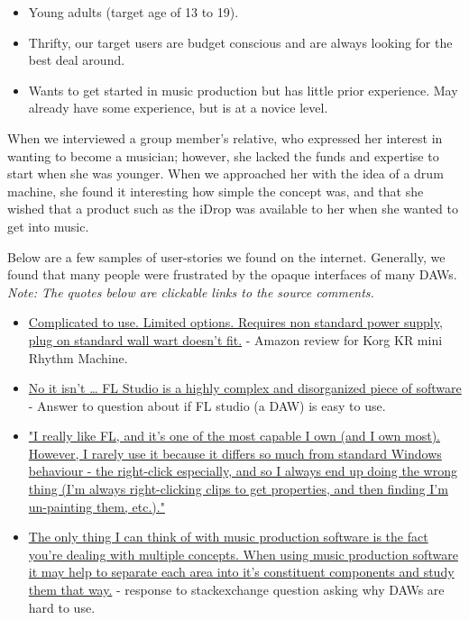 \documentclass[11pt]{article}
\begin{document}
\begin{itemize}
\item Young adults (target age of 13 to 19).
\item Thrifty, our target users are budget conscious and are always looking for the best deal around.
\item Wants to get started in music production but has little prior experience. May already have some experience, but is at a novice level.
\end{itemize}


When we interviewed a group member’s relative, who expressed her
interest in wanting to become a musician; however, she lacked the
funds and expertise to start when she was younger. When we approached
her with the idea of a drum machine, she found it interesting how
simple the concept was, and that she wished that a product such as the
iDrop was available to her when she wanted to get into music.

Below are a few samples of user-stories we found on the internet. Generally,
we found that many people were frustrated by the opaque interfaces of many
DAWs. \emph{Note: The quotes below are clickable links to the source comments.}

\begin{itemize}
\item \href{https://www.amazon.ca/gp/customer-reviews/R1OFNI0GNZ2VC?ref=pf\_vv\_at\_pdctrvw\_srp}{ Complicated to use. Limited options. Requires non standard power supply, plug on standard wall wart doesn't fit.} - Amazon review for Korg KR mini Rhythm Machine.
\item \href{https://www.quora.com/Is-FL-Studio-easy-to-learn}{No it isn't \ldots{} FL Studio is a highly complex and disorganized piece of software} - Answer to question about if FL studio (a DAW) is easy to use.
\item \href{https://www.kvraudio.com/forum/viewtopic.php?f=7\&t=360703\&sid=2d239239fdd437172d4208545e3d608b}{"I really like FL, and it's one of the most capable I own (and I own most). However, I rarely use it because it differs so much from standard Windows behaviour - the right-click especially, and so I always end up doing the wrong thing (I'm always right-clicking clips to get properties, and then finding I'm un-painting them, etc.)." }
\item \href{https://sound.stackexchange.com/questions/25161/why-is-learning-how-to-use-daws-appear-more-difficult-than-video-editing-program}{ The only thing I can think of with music production software is the fact you're dealing with multiple concepts. When using music production software it may help to separate each area into it's constituent components and study them that way.} - response to stackexchange question asking why DAWs are hard to use.
\end{itemize}
\end{document}
